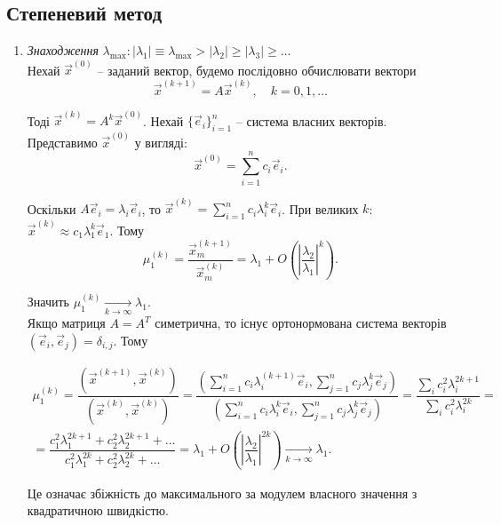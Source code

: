 \documentclass[12pt, a4paper]{article}
\theoremstyle{definition}
\newcommand{\Sum}{\displaystyle\sum\limits}
\numberwithin{equation}{section}
\begin{document}
\subsection{Степеневий метод}
\begin{enumerate}
	\item \textit{Знаходження} $\lambda_{\max}: |\lambda_1|\equiv\lambda_{\max}> |\lambda_2| \ge |\lambda_3| \ge \ldots$ \\

	Нехай $\vec x^{(0)}$ -- заданий вектор, будемо послідовно обчислювати вектори
	\begin{equation}
		\label{eq:5.2}
		\vec x^{(k+1)} = A \vec x^{(k)}, \quad k = 0, 1, \ldots
	\end{equation}

	Тоді $\vec x^{(k)} = A^k \vec x^{(0)}$. Нехай $\{\vec e_i\}_{i=1}^n$ -- система власних векторів. Представимо $\vec x^{(0)}$ у вигляді: \[ \vec x^{(0)} = \Sum_{i=1}^n c_i \vec e_i. \]

	Оскільки $A \vec e_i = \lambda_i \vec e_i$, то $\vec x^{(k)} = \Sum_{i=1}^n c_i \lambda_i^k \vec e_i$. При великих $k$: $\vec x^{(k)} \approx c_1 \lambda_1^k \vec e_1$. Тому \[ \mu_1^{(k)} = \dfrac{\vec x_m^{(k+1)}}{\vec x_m^{(k)}} = \lambda_1 + O \left( \left| \dfrac{\lambda_2}{\lambda_1} \right|^k \right). \]

	Значить $\mu_1^{(k)} \xrightarrow[k\to\infty]{} \lambda_1$. \\

	Якщо матриця $A = A^T$ симетрична, то існує ортонормована система векторів $(\vec e_i, \vec e_j) = \delta_{i,j}$. Тому

	\begin{multline*}
		\mu_1^{(k)} = \dfrac{(\vec x^{(k+1)}, \vec x^{(k)})}{(\vec x^{(k)}, \vec x^{(k)})} = \dfrac{\left(\Sum_{i=1}^n c_i \lambda_i^(k+1) \vec e_i,\Sum_{j=1}^n c_j \lambda_j^k \vec e_j\right)}{\left(\Sum_{i=1}^n c_i \lambda_i^k \vec e_i,\Sum_{j=1}^n c_j \lambda_j^k \vec e_j\right)} = \dfrac{\Sum_i c_i^2 \lambda_i^{2k+1}}{\Sum_i c_i^2 \lambda_i^{2k}} = \\
		= \dfrac{c_1^2\lambda_1^{2k+1}+c_2^2\lambda_2^{2k+1}+\ldots}{c_1^2\lambda_1^{2k}+c_2^2\lambda_2^{2k}+\ldots} = \lambda_1 + O \left( \left| \dfrac{\lambda_2}{\lambda_1} \right|^{2k} \right) \xrightarrow[k\to\infty]{} \lambda_1.
	\end{multline*}

	Це означає збіжність до максимального за модулем власного значення з квадратичною швидкістю.\\


\end{enumerate}
\end{document}
